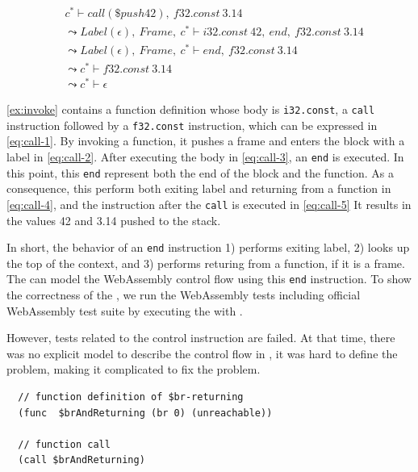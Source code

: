  \\
\begin{align}
  &c^* \vdash call(\$push42), ~ f32.const ~ 3.14 \label{eq:call-1} \\
&\leadsto
  Label(\epsilon), ~ Frame, ~ c^* \vdash i32.const ~ 42, ~ end, ~ f32.const ~ 3.14 \label{eq:call-2} \\
&\leadsto
  Label(\epsilon), ~ Frame, ~ c^* \vdash end, ~ f32.const ~ 3.14 \label{eq:call-3} \\
&\leadsto
  c^* \vdash f32.const ~ 3.14 \label{eq:call-4} \\
&\leadsto
  c^* \vdash \epsilon \label{eq:call-5}
\end{align}

\cref{ex:invoke} contains a function definition whose body is \texttt{i32.const}, a
\texttt{call} instruction followed by a \texttt{f32.const} instruction, which
can be expressed in \cref{eq:call-1}.
By invoking a function, it pushes a frame and enters the block with a label in
\cref{eq:call-2}.
After executing the body in \cref{eq:call-3}, an \texttt{end} is executed.
In this point, this \texttt{end} represent both the end of the block and the
function.
As a consequence, this  perform both exiting label and returning from
a function in \cref{eq:call-4}, and the instruction after the \texttt{call} is
executed in \cref{eq:call-5}
It results in the values 42 and 3.14 pushed to the stack.


In short, the behavior of an \texttt{end} instruction 1) performs exiting
label, 2) looks up the top of the context, and 3) performs returing from a
function, if it is a frame.
The \spectecp{} can model the WebAssembly control flow using this \texttt{end}
instruction.
To show the correctness of the \spectecp{}, we run the WebAssembly tests
including official WebAssembly test suite by executing the \spectecp{} with
.


However, tests related to the control instruction are failed.
At that time, there was no explicit model to describe the control flow in
\spectecp{}, it was hard to define the problem, making it complicated to fix
the problem.




\begin{example}
\label{ex:bug}
\begin{verbatim}
  // function definition of $br-returning
  (func  $brAndReturning (br 0) (unreachable))

  // function call
  (call $brAndReturning)
\end{verbatim}
\end{example}

